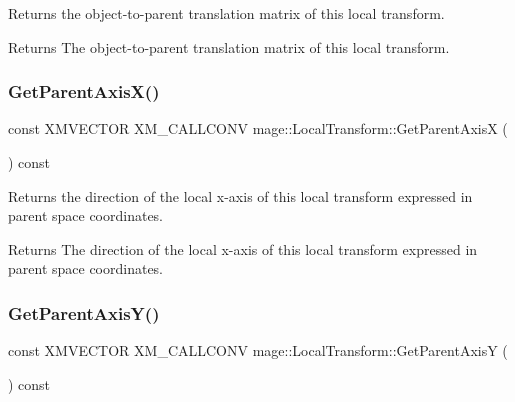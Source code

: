 Returns the object-\/to-\/parent translation matrix of this local transform.

\begin{DoxyReturn}{Returns}
The object-\/to-\/parent translation matrix of this local transform. 
\end{DoxyReturn}
\hypertarget{classmage_1_1_local_transform_a211651b89d7720bf98468ea7665b74d9}{}\label{classmage_1_1_local_transform_a211651b89d7720bf98468ea7665b74d9} 
\subsubsection{\texorpdfstring{Get\+Parent\+Axis\+X()}{GetParentAxisX()}}
{\footnotesize\ttfamily const X\+M\+V\+E\+C\+T\+OR X\+M\+\_\+\+C\+A\+L\+L\+C\+O\+NV mage\+::\+Local\+Transform\+::\+Get\+Parent\+AxisX (\begin{DoxyParamCaption}{ }\end{DoxyParamCaption}) const\hspace{0.3cm}{\ttfamily [noexcept]}}

Returns the direction of the local x-\/axis of this local transform expressed in parent space coordinates.

\begin{DoxyReturn}{Returns}
The direction of the local x-\/axis of this local transform expressed in parent space coordinates. 
\end{DoxyReturn}
\hypertarget{classmage_1_1_local_transform_af53f1ef489bc5dec9d5b8ccea6e5e9bf}{}\label{classmage_1_1_local_transform_af53f1ef489bc5dec9d5b8ccea6e5e9bf} 
\subsubsection{\texorpdfstring{Get\+Parent\+Axis\+Y()}{GetParentAxisY()}}
{\footnotesize\ttfamily const X\+M\+V\+E\+C\+T\+OR X\+M\+\_\+\+C\+A\+L\+L\+C\+O\+NV mage\+::\+Local\+Transform\+::\+Get\+Parent\+AxisY (\begin{DoxyParamCaption}{ }\end{DoxyParamCaption}) const\hspace{0.3cm}{\ttfamily [noexcept]}}


